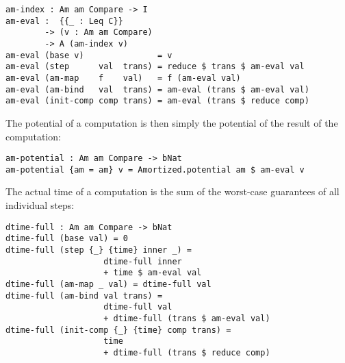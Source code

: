 \begin{lstlisting}[caption={Evaluating amortized computations},label={lst:amortized:framework:eval},emph={am,index,eval}]
am-index : Am am Compare -> I
am-eval :  {{_ : Leq C}}
        -> (v : Am am Compare)
        -> A (am-index v)
am-eval (base v)               = v
am-eval (step      val  trans) = reduce $ trans $ am-eval val
am-eval (am-map    f    val)   = f (am-eval val)
am-eval (am-bind   val  trans) = am-eval (trans $ am-eval val)
am-eval (init-comp comp trans) = am-eval (trans $ reduce comp)
\end{lstlisting}

The potential of a computation is then simply the potential of the result of the computation:

\noindent\begin{minipage}{\linewidth}
\begin{lstlisting}[caption={Potential of a computation},label={lst:amortized:framework:pot},emph={am,potential}]
am-potential : Am am Compare -> bNat
am-potential {am = am} v = Amortized.potential am $ am-eval v
\end{lstlisting}
\end{minipage}

The actual time of a computation is the sum of the worst-case guarantees of all individual steps:

\begin{lstlisting}[caption={Actual time},label={lst:amortized:framework:actualtime},emph={dtime,full}]
dtime-full : Am am Compare -> bNat
dtime-full (base val) = 0
dtime-full (step {_} {time} inner _) =
                    dtime-full inner
                    + time $ am-eval val
dtime-full (am-map _ val) = dtime-full val
dtime-full (am-bind val trans) =
                    dtime-full val
                    + dtime-full (trans $ am-eval val)
dtime-full (init-comp {_} {time} comp trans) =
                    time
                    + dtime-full (trans $ reduce comp)
\end{lstlisting}

